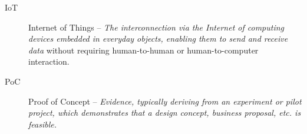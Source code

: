 \printglossaries
\begin{description}
	\item[IoT] Internet of Things -- \textit{The interconnection via the Internet of computing devices embedded in everyday objects, enabling them to send and receive data} \cite{IoT-dictionary} without requiring human-to-human or human-to-computer interaction. \cite{IoT-definition-no-interaction}
	\item[PoC] Proof of Concept -- \textit{Evidence, typically deriving from an experiment or pilot project, which demonstrates that a design concept, business proposal, etc. is feasible.} \cite{PoC-dictionary}
\end{description}
